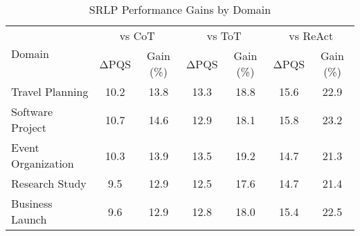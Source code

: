 \begin{table}[htbp]
\centering
\caption{SRLP Performance Gains by Domain}
\label{tab:domain_gains}
\begin{tabular}{lcccccc}
\toprule
\multirow{2}{*}{Domain} & \multicolumn{2}{c}{vs CoT} & \multicolumn{2}{c}{vs ToT} & \multicolumn{2}{c}{vs ReAct} \\
\cmidrule(lr){2-3} \cmidrule(lr){4-5} \cmidrule(lr){6-7}
 & ΔPQS & Gain (\%) & ΔPQS & Gain (\%) & ΔPQS & Gain (\%) \\
\midrule
Travel Planning & 10.2 & 13.8 & 13.3 & 18.8 & 15.6 & 22.9 \\
Software Project & 10.7 & 14.6 & 12.9 & 18.1 & 15.8 & 23.2 \\
Event Organization & 10.3 & 13.9 & 13.5 & 19.2 & 14.7 & 21.3 \\
Research Study & 9.5 & 12.9 & 12.5 & 17.6 & 14.7 & 21.4 \\
Business Launch & 9.6 & 12.9 & 12.8 & 18.0 & 15.4 & 22.5 \\
\bottomrule
\end{tabular}
\end{table}